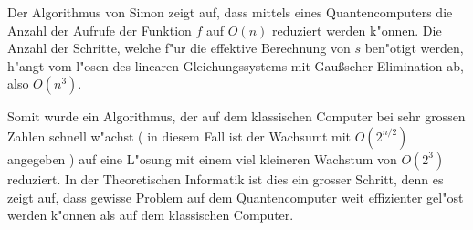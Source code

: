 \begin{refsection}
Der Algorithmus von Simon zeigt auf, dass mittels eines Quantencomputers die
Anzahl der Aufrufe der Funktion $f$ auf $O(n)$ reduziert werden k"onnen. Die
Anzahl der Schritte, welche f"ur die effektive Berechnung von $s$ ben"otigt
werden, h"angt vom l"osen des linearen Gleichungssystems mit Gaußscher
Elimination ab, also $O(n^3)$. 
\cite{simon:cs191}

Somit wurde ein Algorithmus, der auf dem klassischen Computer bei sehr grossen
Zahlen schnell w"achst ( in diesem Fall ist der Wachsumt mit $O(2^{n/2})$
angegeben ) auf eine L"osung mit einem viel kleineren Wachstum von $O(2^3)$
reduziert. In der Theoretischen Informatik ist dies ein grosser Schritt, denn
es zeigt auf, dass gewisse Problem auf dem Quantencomputer weit effizienter
gel"ost werden k"onnen als auf dem klassischen Computer.


\printbibliography[heading=subbibliography] \end{refsection}


